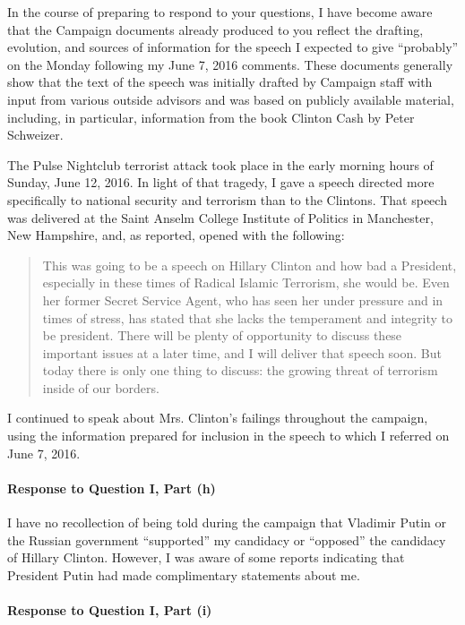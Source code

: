 In the course of preparing to respond to your questions, I have become aware that the Campaign documents already produced to you reflect the drafting, evolution, and sources of information for the speech I expected to give “probably” on the Monday following my June 7, 2016 comments.
These documents generally show that the text of the speech was initially drafted by Campaign staff with input from various outside advisors and was based on publicly available material, including, in particular, information from the book Clinton Cash by Peter Schweizer.

The Pulse Nightclub terrorist attack took place in the early morning hours of Sunday, June 12, 2016.
In light of that tragedy, I gave a speech directed more specifically to national security and terrorism than to the Clintons.
That speech was delivered at the Saint Anselm College Institute of Politics in Manchester, New Hampshire, and, as reported, opened with the following:

\begin{quote}
This was going to be a speech on Hillary Clinton and how bad a President, especially in these times of Radical Islamic Terrorism, she would be.
Even her former Secret Service Agent, who has seen her under pressure and in times of stress, has stated that she lacks the temperament and integrity to be president.
There will be plenty of opportunity to discuss these important issues at a later time, and I will deliver that speech soon.
But today there is only one thing to discuss: the growing threat of terrorism inside of our borders.
\end{quote}

I continued to speak about Mrs. Clinton’s failings throughout the campaign, using the information prepared for inclusion in the speech to which I referred on June 7, 2016.

\paragraph*{Response to Question I, Part (h)}

I have no recollection of being told during the campaign that Vladimir Putin or the Russian government “supported” my candidacy or “opposed” the candidacy of Hillary Clinton.
However, I was aware of some reports indicating that President Putin had made complimentary statements about me.

\paragraph*{Response to Question I, Part (i)}

